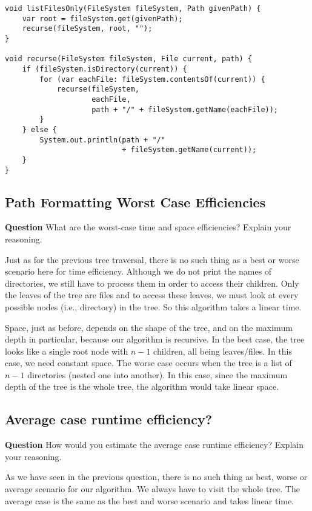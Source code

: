 \documentclass[11pt]{article}
\begin{document}
\begin{verbatim}
void listFilesOnly(FileSystem fileSystem, Path givenPath) {
    var root = fileSystem.get(givenPath);
    recurse(fileSystem, root, "");
}

void recurse(FileSystem fileSystem, File current, path) {
    if (fileSystem.isDirectory(current)) {
        for (var eachFile: fileSystem.contentsOf(current)) {
            recurse(fileSystem,
                    eachFile,
                    path + "/" + fileSystem.getName(eachFile));
        }
    } else {
        System.out.println(path + "/"
                           + fileSystem.getName(current));
    } 
}
\end{verbatim}

\subsection{Path Formatting Worst Case Efficiencies}
\label{sec:org005e9ee}

\textbf{Question} What are the worst-case time and space efficiencies?
Explain your reasoning.

Just as for the previous tree traversal, there is no such thing as
a best or worse scenario here for time efficiency. Although we do
not print the names of directories, we still have to process them
in order to access their children. Only the leaves of the tree are
files and to access these leaves, we must look at every possible
nodes (i.e., directory) in the tree. So this algorithm takes a
linear time.

Space, just as before, depends on the shape of the tree, and on the
maximum depth in particular, because our algorithm is recursive. In
the best case, the tree looks like a single root node with \(n-1\)
children, all being leaves/files. In this case, we need constant
space. The worse case occurs when the tree is a list of \(n-1\)
directories (nested one into another). In this case, since the
maximum depth of the tree is the whole tree, the algorithm would
take linear space.


\subsection{Average case runtime efficiency?}
\label{sec:org86c8aa6}
\textbf{Question} How would you estimate the average case runtime efficiency?
   Explain your reasoning.

As we have seen in the previous question, there is no such thing as
best, worse or average scenario for our algorithm. We always have to
visit the whole tree. The average case is the same as the best and
worse scenario and takes linear time.
\end{document}
